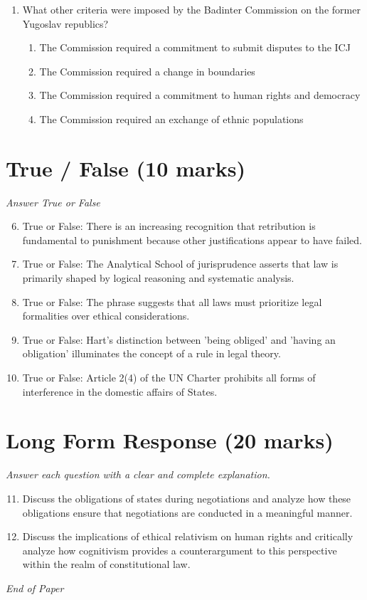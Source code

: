 \documentclass[12pt]{article}
\begin{document}
\begin{enumerate}[label=\arabic*.]
\begin{enumerate}[label=(\alph*)]
    \item Airey v Ireland (1979)
    \item Osman v UK ( 1998)
    \item Handyside v UK (1976)
\end{enumerate}
\item What other criteria were imposed by the Badinter Commission on the former Yugoslav republics?
\begin{enumerate}[label=(\alph*)]
    \item The Commission required a commitment to submit disputes to the ICJ
    \item The Commission required a change in boundaries
    \item The Commission required a commitment to human rights and democracy
    \item The Commission required an exchange of ethnic populations
\end{enumerate}
\end{enumerate}

\section*{True / False (10 marks)}
\textit{Answer True or False}
\begin{enumerate}[label=\arabic*.]
\setcounter{enumi}{5}
\item True or False: There is an increasing recognition that retribution is fundamental to punishment because other justifications appear to have failed.
\item True or False: The Analytical School of jurisprudence asserts that law is primarily shaped by logical reasoning and systematic analysis.
\item True or False: The phrase suggests that all laws must prioritize legal formalities over ethical considerations.
\item True or False: Hart's distinction between 'being obliged' and 'having an obligation' illuminates the concept of a rule in legal theory.
\item True or False: Article 2(4) of the UN Charter prohibits all forms of interference in the domestic affairs of States.
\end{enumerate}

\section*{Long Form Response (20 marks)}
\textit{Answer each question with a clear and complete explanation.}
\begin{enumerate}[label=\arabic*.]
\setcounter{enumi}{10}
\item Discuss the obligations of states during negotiations and analyze how these obligations ensure that negotiations are conducted in a meaningful manner.
\item Discuss the implications of ethical relativism on human rights and critically analyze how cognitivism provides a counterargument to this perspective within the realm of constitutional law.
\end{enumerate}

\vfill
\noindent\textit{End of Paper}
\end{document}
